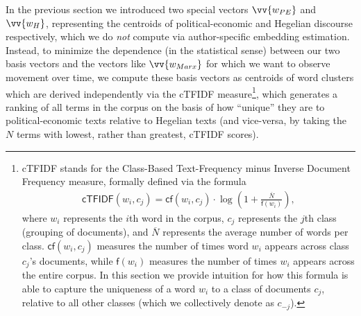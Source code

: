 \documentclass[11pt]{article}
\newcommand{\cTFIDF}[0]{\textsf{cTFIDF}}
\begin{document}
In the previous section we introduced two special vectors $\vv{w_{PE}}$ and $\vv{w_H}$, representing the centroids of political-economic and Hegelian discourse respectively, which we do \textit{not} compute via author-specific embedding estimation. Instead, to minimize the dependence (in the statistical sense) between our two basis vectors and the vectors like $\vv{w_{Marx}}$ for which we want to observe movement over time, we compute these basis vectors as centroids of word clusters which are derived independently via the \cTFIDF{} measure\footnote{\cTFIDF{} stands for the Class-Based Text-Frequency minus Inverse Document Frequency measure, formally defined via the formula
\begin{align*}
\textsf{cTFIDF}(w_i,c_j) = \textsf{cf}(w_i,c_j) \cdot \log\left(1 + \frac{\overline{N}}{\textsf{f}(w_i)}\right),
\end{align*}
where $w_i$ represents the $i$th word in the corpus, $c_j$ represents the $j$th class (grouping of documents), and $\overline{N}$ represents the average number of words per class. $\textsf{cf}(w_i, c_j)$ measures the number of times word $w_i$ appears across class $c_j$'s documents, while $\textsf{f}(w_i)$ measures the number of times $w_i$ appears across the entire corpus. In this section we provide intuition for how this formula is able to capture the uniqueness of a word $w_i$ to a class of documents $c_j$, relative to all other classes (which we collectively denote as $c_{-j}$).
}, which generates a ranking of all terms in the corpus on the basis of how ``unique'' they are to political-economic texts relative to Hegelian texts (and vice-versa, by taking the $N$ terms with lowest, rather than greatest, \cTFIDF{} scores).
\end{document}

